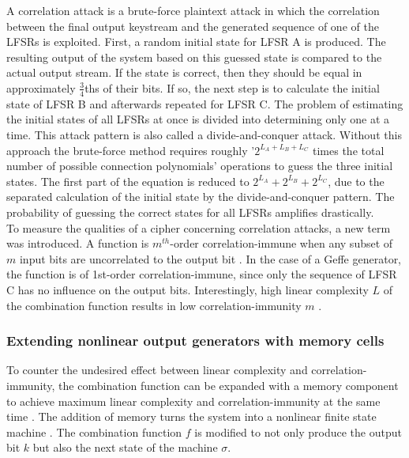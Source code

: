 A correlation attack is a brute-force plaintext attack in which the correlation between the final output keystream and the generated sequence of one of the LFSRs is exploited. First, a random initial state for LFSR A is produced. The resulting output of the system based on this guessed state is compared to the actual output stream. If the state is correct, then they should be equal in approximately $\frac{3}{4}$ths of their bits. If so, the next step is to calculate the initial state of LFSR B and afterwards repeated for LFSR C. The problem of estimating the initial states of all LFSRs at once is divided into determining only one at a time. This attack pattern is also called a divide-and-conquer attack. \cite[p. 17]{Robshaw.1995} Without this approach the brute-force method requires roughly '$2^{L_A + L_B + L_C}$ times the total number of possible connection polynomials' operations to guess the three initial states. The first part of the equation is reduced to $2^{L_A}+2^{L_B}+2^{L_C}$, due to the separated calculation of the initial state by the divide-and-conquer pattern. The probability of guessing the correct states for all LFSRs amplifies drastically. \cite[p. 235]{Smart.2016} \\

To measure the qualities of a cipher concerning correlation attacks, a new term was introduced. A function is $m^{th}$-order correlation-immune when any subset of $m$ input bits are uncorrelated to the output bit \cite[p. 777]{Siegenthaler.1984}. In the case of a Geffe generator, the function is of 1st-order correlation-immune, since only the sequence of LFSR C has no influence on the output bits. Interestingly, high linear complexity $L$ of the combination function results in low correlation-immunity $m$ \cite[p. 779]{Siegenthaler.1984}. 


\subsubsection{Extending nonlinear output generators with memory cells}

To counter the undesired effect between linear complexity and correlation-immunity, the combination function can be expanded with a memory component to achieve maximum linear complexity and correlation-immunity at the same time \cite[p. 17]{Robshaw.1995}. The addition of memory turns the system into a nonlinear finite state machine \cite[p. 209]{Wu.2008}. The combination function $f$ is modified to not only produce the output bit $k$ but also the next state of the machine $\sigma$. \\ 

